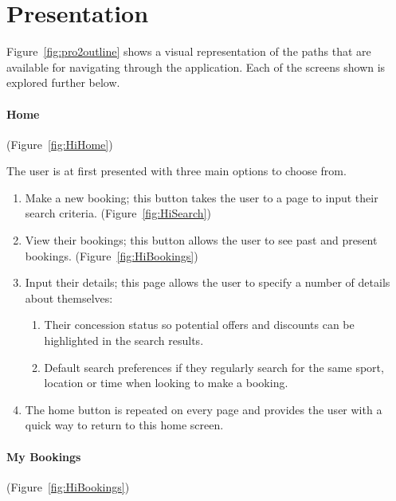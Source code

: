 \section{Presentation}

Figure~\ref{fig:pro2outline} shows a visual representation of the paths that
are available for navigating through the application. Each of the screens shown
is explored further below.

\paragraph{Home} (Figure~\ref{fig:HiHome})


The user is at first presented with three main options to choose from.
\begin{enumerate}
	\item Make a new booking; this button takes the user to a page to input
		their search criteria. (Figure~\ref{fig:HiSearch})
	\item View their bookings; this button allows the user to see past and
		present bookings. (Figure~\ref{fig:HiBookings})
	\item Input their details; this page allows the user to specify a number
		of details about themselves:

		\begin{enumerate}
			\item Their concession status so potential offers and
				discounts can be highlighted in the search results.
			\item Default search preferences if they regularly search for the
				same sport, location or time when looking to make a booking.
		\end{enumerate}
	\item The home button is repeated on every page and provides the user with
		a quick way to return to this home screen.
\end{enumerate}

\paragraph{My Bookings} (Figure~\ref{fig:HiBookings})

